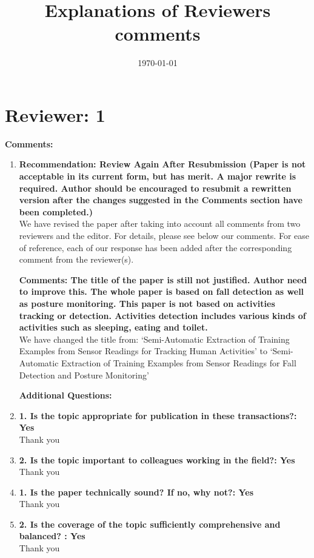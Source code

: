 \documentclass[11pt]{article}
\title{Explanations of Reviewers comments}
\date{\today}
\begin{document}
\maketitle
\section*{Reviewer: 1}


\textbf{Comments:}

\begin{enumerate}

\item\textbf{Recommendation: Review Again After Resubmission (Paper is not acceptable in its current form, but has merit. A major rewrite is required. Author should be encouraged to resubmit a rewritten version after the changes suggested in the Comments section have been completed.)}\\
We have revised the paper after taking into account all comments from two reviewers and the editor. For details, please see below our comments. For ease of reference, each of our response has been added after the corresponding comment from the reviewer(s).

\textbf{Comments:
The title of the paper is still not justified. Author need to improve this. The whole paper is based on fall detection as well as posture monitoring. This paper is not based on activities tracking or detection. Activities detection includes various kinds of activities such as sleeping, eating and toilet.}\\
 We have changed the title from: `Semi-Automatic Extraction of Training Examples from Sensor Readings for Tracking Human  Activities' to `Semi-Automatic Extraction of Training Examples from Sensor Readings for Fall Detection and Posture Monitoring'

\textbf{Additional Questions:}
\item\textbf{1. Is the topic appropriate for publication in these transactions?: Yes}\\
Thank  you

\item\textbf{2. Is the topic important to colleagues working in the field?: Yes}\\
Thank you
\item\textbf{1. Is the paper technically sound? If no, why not?: Yes}\\
Thank you

\item \textbf{2. Is the coverage of the topic sufficiently comprehensive and balanced? : Yes
}\\
Thank you


\end{enumerate}
\end{document}
